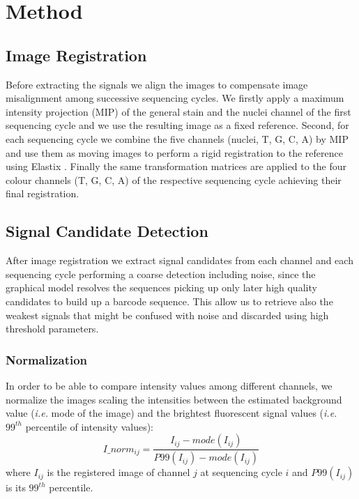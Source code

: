 \documentclass[10pt,journal]{IEEEtran}
\begin{document}
\section{Method}
\subsection{Image Registration}
Before extracting the signals we align the images to compensate image misalignment among successive sequencing cycles.
We firstly apply a maximum intensity projection (MIP) of the general stain and the nuclei channel of the first sequencing cycle and we use the resulting image as a fixed reference. Second, for each sequencing cycle we combine the five channels (nuclei, T, G, C, A) by MIP and use them as moving images to perform a rigid registration to the reference using Elastix \cite{klein2010elastix}. Finally the same transformation matrices are applied to the four colour channels (T, G, C, A) of the respective sequencing cycle achieving their final registration.

\subsection{Signal Candidate Detection}
After image registration we extract signal candidates from each channel and each sequencing cycle performing a coarse detection including noise, since the graphical model resolves the sequences picking up only later high quality candidates to build up a barcode sequence.
This allow us to retrieve also the weakest signals that might be confused with noise and discarded using high threshold parameters.

\subsubsection{Normalization}
In order to be able to compare intensity values among different channels, we normalize the images scaling the intensities between the estimated background value (\textit{i.e.} mode of the image) and the brightest fluorescent signal values (\textit{i.e.} \(99^{th}\) percentile of intensity values):
\[{I\_norm_{ij}=\frac{I_{ij}-mode(I_{ij})}{P99(I_{ij})-mode(I_{ij})}}\]
where \(I_{ij}\) is the registered image of channel \(j\) at sequencing cycle \(i\) and \(P99(I_{ij})\) is its \(99^{th}\) percentile.
\end{document}
